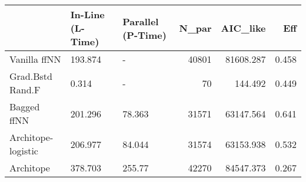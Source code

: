 \begin{tabular}{lllrrr}
\toprule
{} & In-Line (L-Time) & Parallel (P-Time) &  N\_par &   AIC\_like &    Eff \\
\midrule
Vanilla ffNN       &          193.874 &                 - &  40801 &  81608.287 &  0.458 \\
Grad.Bstd Rand.F   &            0.314 &                 - &     70 &    144.492 &  0.449 \\
Bagged ffNN        &          201.296 &            78.363 &  31571 &  63147.564 &  0.641 \\
Architope-logistic &          206.977 &            84.044 &  31574 &  63153.938 &  0.532 \\
Architope          &          378.703 &            255.77 &  42270 &  84547.373 &  0.267 \\
\bottomrule
\end{tabular}

